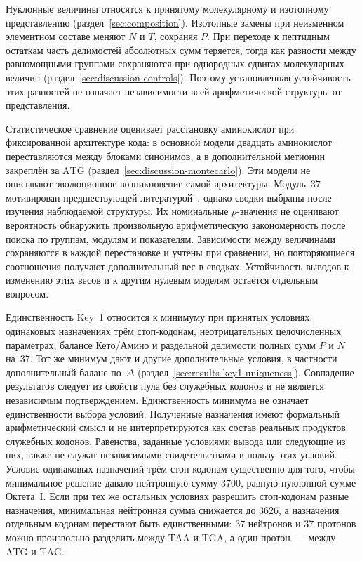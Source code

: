 \documentclass[11pt,a4paper]{article}
\renewcommand{\_}{\origunderscore\allowbreak}
\begin{document}
Нуклонные величины относятся к принятому молекулярному
и изотопному представлению (раздел~\ref{sec:composition}).
Изотопные замены при неизменном элементном составе меняют
$N$ и $T$, сохраняя $P$. При переходе к пептидным остаткам
часть делимостей абсолютных сумм теряется, тогда как разности
между равномощными группами сохраняются при однородных сдвигах
молекулярных величин (раздел~\ref{sec:discussion-controls}).
Поэтому установленная устойчивость этих разностей не означает
независимости всей арифметической структуры от представления.

Статистическое сравнение оценивает расстановку аминокислот
при фиксированной архитектуре кода: в основной модели
двадцать аминокислот переставляются между блоками синонимов,
а в дополнительной метионин закреплён за $\mathrm{ATG}$
(раздел~\ref{sec:discussion-montecarlo}). Эти модели
не описывают эволюционное возникновение самой архитектуры.
Модуль~$37$ мотивирован предшествующей литературой~\cite{shcherbak1993,shcherbak2003,makukov2013,panov2024}, однако
сводки выбраны после изучения наблюдаемой структуры.
Их номинальные $p$-значения не оценивают вероятность обнаружить
произвольную арифметическую закономерность после поиска
по группам, модулям и показателям. Зависимости между величинами
сохраняются в каждой перестановке и учтены при сравнении,
но повторяющиеся соотношения получают дополнительный вес
в сводках. Устойчивость выводов к изменению этих весов
и к другим нулевым моделям остаётся отдельным вопросом.

Единственность Key~1 относится к минимуму при принятых
условиях: одинаковых назначениях трём стоп-кодонам,
неотрицательных целочисленных параметрах, балансе Кето/Амино
и раздельной делимости полных сумм $P$ и $N$ на~$37$.
Тот же минимум дают и другие дополнительные условия,
в частности дополнительный баланс по~$\Delta$
(раздел~\ref{sec:results-key1-uniqueness}).
Совпадение результатов следует из свойств пула без
служебных кодонов и не является независимым подтверждением.
Единственность минимума не означает единственности
выбора условий. Полученные назначения имеют формальный
арифметический смысл и не интерпретируются как состав
реальных продуктов служебных кодонов. Равенства, заданные
условиями вывода или следующие из них, также не служат
независимыми свидетельствами в пользу этих условий.
Условие одинаковых назначений трём стоп-кодонам существенно для того,
чтобы минимальное решение давало нейтронную сумму $3700$, равную
нуклонной сумме Октета~I. Если при тех же остальных условиях разрешить
стоп-кодонам разные назначения, минимальная нейтронная сумма снижается
до $3626$, а назначения отдельным кодонам перестают быть единственными:
$37$ нейтронов и $37$ протонов можно произвольно разделить между
$\mathrm{TAA}$ и $\mathrm{TGA}$, а один протон~--- между $\mathrm{ATG}$
и $\mathrm{TAG}$.
\end{document}
